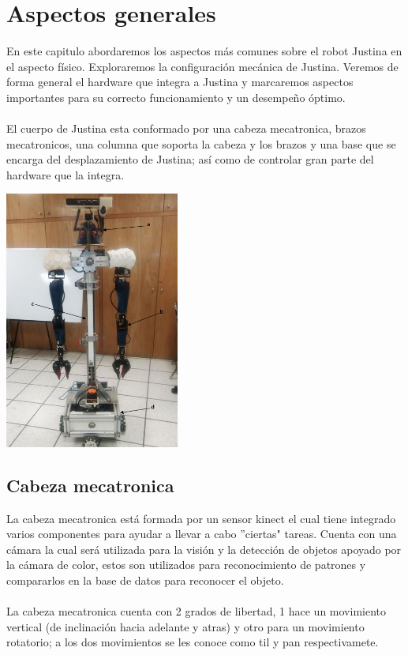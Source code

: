\documentclass[user_manual.tex]{subfiles}
\begin{document}
 \chapter{Aspectos generales}
En este capitulo abordaremos los aspectos más comunes sobre el robot Justina en el aspecto físico. Exploraremos la configuración 
mecánica de Justina. Veremos de forma general el hardware que integra a Justina y marcaremos aspectos importantes para su
correcto funcionamiento y un desempeño óptimo.\\
\\
El cuerpo de Justina esta conformado por una cabeza mecatronica, brazos mecatronicos, una columna que soporta la cabeza y 
los brazos y una base que se encarga del desplazamiento de Justina; así como de controlar gran parte del hardware que la 
integra.


\begin{center}
\includegraphics[width=0.43\textwidth]{Figures/Hardware/Diagramas/Cuerpo.png}
\label{fig:Hardware:Diagramas:Justina:Completa}
\end{center}
\section{Cabeza mecatronica}
 La cabeza mecatronica está formada por un sensor kinect el cual tiene integrado varios componentes para ayudar a
 llevar a cabo ''ciertas" tareas. Cuenta con una cámara la cual será utilizada para la visión y la detección de objetos apoyado por la cámara de color, estos son utilizados para reconocimiento de patrones y compararlos en la 
 base de datos para reconocer el objeto.\\
 \\
 La cabeza mecatronica cuenta con 2 grados de libertad, 1 hace un movimiento vertical (de inclinación hacia adelante y atras) y otro para un movimiento rotatorio; a los dos movimientos se les conoce como til y pan respectivamete.
\end{document}

